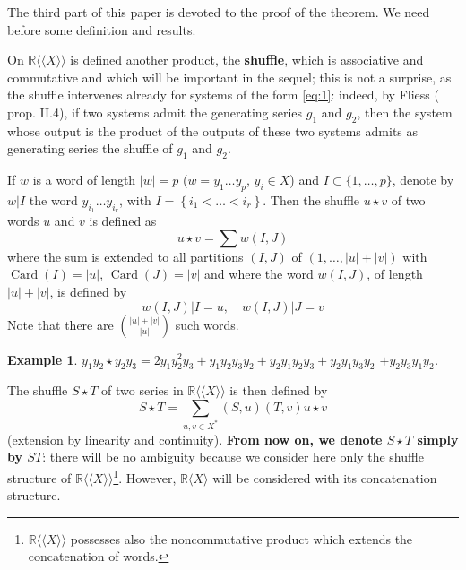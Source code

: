 \documentclass[a4paper,12pt]{article}
\newtheorem*{example*}{Example}
\newcommand{\card}{\operatorname{Card}}
\newcommand{\R}{\mathbb{R}}
\newcommand{\Rx}{\R\langle X\rangle}
\newcommand{\Rxx}{\R\langle\langle X\rangle\rangle}
\begin{document}
The third part of this paper is devoted to the proof of the theorem. We need before some definition and results.

On $\Rxx$ is defined another product, the \textbf{shuffle}, which is associative and commutative and which will be important in the sequel; this is not a surprise, as the shuffle intervenes already for systems of the form \eqref{eq:1}: indeed, by Fliess (\cite{4} prop. II.4), if two systems admit the generating series ${g}_1$ and ${g}_2$, then the system whose output is the product of the outputs of these two systems admits as generating series the shuffle of ${g}_1$ and ${g}_2$.

If $w$ is a word of length $|w|=p$ ($w=y_1 \ldots y_p$, $y_i \in X$) and $I \subset \{1, \ldots, p\}$, denote by $w|I$ the word $y_{i_1} \ldots y_{i_r}$, with $I=\left\{i_1<\ldots<i_r\right\}$. Then the shuffle $u \star v$ of two words $u$ and $v$ is defined as
\begin{equation*}
	u \star v= \sum w(I, J)
\end{equation*}
where the sum is extended to all partitions $(I, J)$ of $(1, \ldots,|u|+|v|)$ with $\card(I)=|u|$, $\card(J)=|v|$ and where the word $w(I, J)$, of length $|u|+|v|$, is defined by
\begin{equation*}
	w(I, J)|I=u, \quad w(I, J)| J=v
\end{equation*}
Note that there are ${|u|+|v|}\choose{|u|}$ such words.

\begin{example*}
	${y}_1 {y}_2 \star {y}_2 {y}_3=2 {y}_1 {y}_2^2 {y}_3+{y}_1 {y}_2 {y}_3 {y}_2+{y}_2 {y}_1 {y}_2 {y}_3+{y}_2 {y}_1 {y}_3 {y}_2$ $+{y}_2 {y}_3 {y}_1 {y}_2$. 
\end{example*}	
	
The shuffle $S \star T$ of two series in $\Rxx$ is then defined by
\begin{equation*}
	S \star T =\sum_{{u}, {v} \in {X}^*}(S, {u})({T}, {v}) {u} \star {v}
\end{equation*}
(extension by linearity and continuity). \textbf{From now on, we denote $S \star T$ simply by ${S} {T}$}: there will be no ambiguity because we consider here only the shuffle structure of $\Rxx$\footnote{$\Rxx$ possesses also the noncommutative product which extends the concatenation of words.}. However, $\Rx$ will be considered with its concatenation structure.
\end{document}
